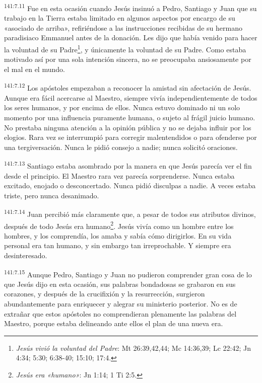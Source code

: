 \par
\textsuperscript{141:7.11} Fue en esta ocasión cuando Jesús insinuó a Pedro, Santiago y Juan que su trabajo en la Tierra estaba limitado en algunos aspectos por encargo de su «asociado de arriba», refiriéndose a las instrucciones recibidas de su hermano paradisiaco Emmanuel antes de la donación. Les dijo que había venido para hacer la voluntad de su Padre\footnote{\textit{Jesús vivió la voluntad del Padre}: Mt 26:39,42,44; Mc 14:36,39; Lc 22:42; Jn 4:34; 5:30; 6:38-40; 15:10; 17:4.}, y únicamente la voluntad de su Padre. Como estaba motivado así por una sola intención sincera, no se preocupaba ansiosamente por el mal en el mundo.

\par
\textsuperscript{141:7.12} Los apóstoles empezaban a reconocer la amistad sin afectación de Jesús. Aunque era fácil acercarse al Maestro, siempre vivía independientemente de todos los seres humanos, y por encima de ellos. Nunca estuvo dominado ni un solo momento por una influencia puramente humana, o sujeto al frágil juicio humano. No prestaba ninguna atención a la opinión pública y no se dejaba influir por los elogios. Rara vez se interrumpió para corregir malentendidos o para ofenderse por una tergiversación. Nunca le pidió consejo a nadie; nunca solicitó oraciones.

\par
\textsuperscript{141:7.13} Santiago estaba asombrado por la manera en que Jesús parecía ver el fin desde el principio. El Maestro rara vez parecía sorprenderse. Nunca estaba excitado, enojado o desconcertado. Nunca pidió disculpas a nadie. A veces estaba triste, pero nunca desanimado.

\par
\textsuperscript{141:7.14} Juan percibió más claramente que, a pesar de todos sus atributos divinos, después de todo Jesús era humano\footnote{\textit{Jesús era «humano»}: Jn 1:14; 1 Ti 2:5.}. Jesús vivía como un hombre entre los hombres, y los comprendía, los amaba y sabía cómo dirigirlos. En su vida personal era tan humano, y sin embargo tan irreprochable. Y siempre era desinteresado.

\par
\textsuperscript{141:7.15} Aunque Pedro, Santiago y Juan no pudieron comprender gran cosa de lo que Jesús dijo en esta ocasión, sus palabras bondadosas se grabaron en sus corazones, y después de la crucifixión y la resurrección, surgieron abundantemente para enriquecer y alegrar su ministerio posterior. No es de extrañar que estos apóstoles no comprendieran plenamente las palabras del Maestro, porque estaba delineando ante ellos el plan de una nueva era.


